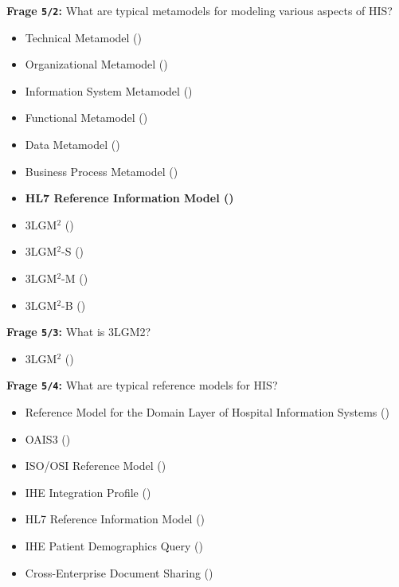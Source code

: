 \textbf{Frage \texttt{5/2}:} What are typical metamodels for modeling various aspects of HIS?

\begin{itemize}
  \item Technical Metamodel ()
  \item Organizational Metamodel ()
  \item Information System Metamodel ()
  \item Functional Metamodel ()
  \item Data Metamodel ()
  \item Business Process Metamodel ()
  \item \textbf{ HL7 Reference Information Model ()}
  \item 3LGM$^{2}$ ()
  \item 3LGM$^{2}$-S ()
  \item 3LGM$^{2}$-M ()
  \item 3LGM$^{2}$-B ()
\end{itemize}

\textbf{Frage \texttt{5/3}:} What is 3LGM2?

\begin{itemize}
  \item 3LGM$^{2}$ ()
\end{itemize}

\textbf{Frage \texttt{5/4}:} What are typical reference models for HIS?

\begin{itemize}
  \item Reference Model for the Domain Layer of Hospital Information Systems ()
  \item OAIS3 ()
  \item ISO/OSI Reference Model ()
  \item IHE Integration Profile ()
  \item HL7 Reference Information Model ()
  \item IHE Patient Demographics Query ()
  \item Cross-Enterprise Document Sharing ()
\end{itemize}

